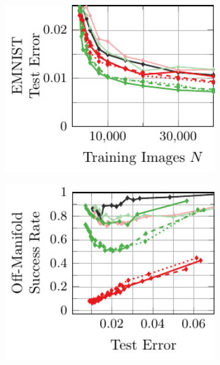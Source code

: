 \begin{appendix}
\begin{figure}[t]
    \\
    \begin{subfigure}[t]{0.235\textwidth}
        \centering
        \includegraphics[width=1\textwidth]{appendix_baselines_emnist_error_accuracy.pdf}
    \end{subfigure}
    \begin{subfigure}[t]{0.235\textwidth}
        \centering
        \includegraphics[width=1\textwidth]{appendix_baselines_emnist_error_off_accuracy.pdf}
    \end{subfigure}
    \\

\end{figure}
\end{appendix}
